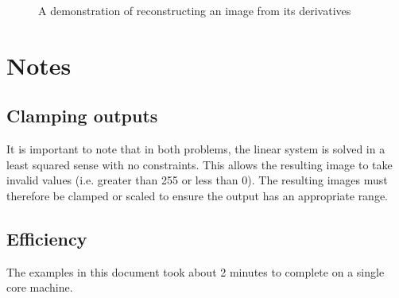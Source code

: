 \documentclass{InsightArticle}
\begin{document}
\begin{figure}[H]
\centering
{}
\caption{A demonstration of reconstructing an image from its derivatives}
\label{fig:RegionCopying}
\end{figure}

\section{Notes}
\subsection{Clamping outputs}
It is important to note that in both problems, the linear system is solved in a least squared sense with no constraints. This allows the resulting image to take invalid values (i.e. greater than 255 or less than 0). The resulting images must therefore be clamped or scaled to ensure the output has an appropriate range.

\subsection{Efficiency}
The examples in this document took about 2 minutes to complete on a single core machine.


\end{document}
